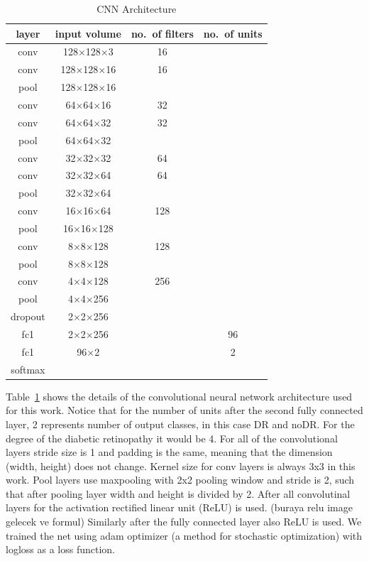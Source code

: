 \begin{table}[t]
\centering
\caption{CNN Architecture} \label{tab:cnnarc}
\begin{tabular}{|c|c|c|c|} \hline
\textbf{layer} & \textbf{input volume} & \textbf{no.\ of filters} & \textbf{no.\ of units} \\ \hline
conv & 128$\times$128$\times$3 & 16 & \\ \hline
conv & 128$\times$128$\times$16 & 16 & \\ \hline
pool & 128$\times$128$\times$16 &  & \\ \hline
conv & 64$\times$64$\times$16 & 32 & \\ \hline
conv & 64$\times$64$\times$32 & 32 & \\ \hline
pool & 64$\times$64$\times$32 &  & \\ \hline
conv & 32$\times$32$\times$32 & 64  & \\ \hline
conv & 32$\times$32$\times$64 & 64  & \\ \hline
pool & 32$\times$32$\times$64 &   & \\ \hline
conv & 16$\times$16$\times$64 & 128  & \\ \hline
pool & 16$\times$16$\times$128 &   & \\ \hline
conv & 8$\times$8$\times$128 & 128  & \\ \hline
pool & 8$\times$8$\times$128 &   & \\ \hline
conv & 4$\times$4$\times$128 & 256  & \\ \hline
pool & 4$\times$4$\times$256 &   & \\ \hline
dropout & 2$\times$2$\times$256 & & \\ \hline
fc1 & 2$\times$2$\times$256 & &96 \\ \hline
fc1 & 96$\times$2 & &2 \\ \hline
softmax & & & \\ \hline
\end{tabular}
\end{table}

Table~\ref{tab:cnnarc} shows the details of the convolutional neural network architecture used for this work. Notice that for the number of units after the second fully connected layer, 2 represents number of output classes, in this case DR and noDR. For the degree of the diabetic retinopathy it would be 4. For all of the convolutional layers stride size is 1 and padding is the same, meaning that the dimension (width, height) does not change. Kernel size for conv layers is always 3x3 in this work. Pool layers use maxpooling with 2x2 pooling window and stride is 2, such that after pooling layer width and height is divided by 2. After all convolutinal layers for the activation rectified linear unit (ReLU) is used. (buraya relu image gelecek ve formul) Similarly after the fully connected layer also ReLU is used. 
We trained the net using adam optimizer (a method for stochastic optimization) \citep{kingma2014adam} with  logloss as a loss function. 





